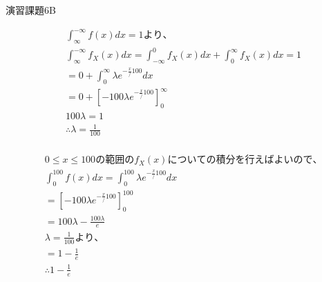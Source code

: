 \documentclass[dvipdfmx,uplatex]{jsarticle}
\begin{document}
  \newpage
  \centerline{\huge 演習課題6B}
  \vspace{10mm}
  \begin{equation}
    \begin{aligned}
        &\int_{\infty}^{-\infty} f(x) dx = 1 より、 \nonumber\\
        &\int_{\infty}^{-\infty} {f}_{X}(x) dx = \int_{-\infty}^{0} {f}_{X}(x) dx + \int_{0}^{\infty} {f}_{X}(x) dx = 1 \nonumber\\
        &=0 + \int_{0}^{\infty} \lambda e^{-\frac{x}/100} dx \nonumber\\
        &=0 + \left[ -100 \lambda e^{-\frac{x}/100}  \right]_0^\infty\nonumber\\
        &100\lambda=1\nonumber\\
        &\therefore \lambda=\frac{1}{100}\nonumber\\
    \end{aligned}
\end{equation}

\begin{equation}
  \begin{aligned}
    &0 \leq x \leq 100の範囲の{f}_{X}(x)についての積分を行えばよいので、\nonumber\\
    &\int_{0}^{100} f(x) dx = \int_{0}^{100} \lambda e^{-\frac{x}/100} dx\nonumber\\
    &= \left[ -100 \lambda e^{-\frac{x}/100}  \right]_0^100 \nonumber\\
    &= 100\lambda - \frac{100\lambda}{e}\nonumber\\
    &\lambda = \frac{1}{100}より、\nonumber\\
    &=1-\frac{1}{e}\nonumber\\
    &\therefore 1-\frac{1}{e}\nonumber\\
  \end{aligned}
\end{equation}
\end{document}
